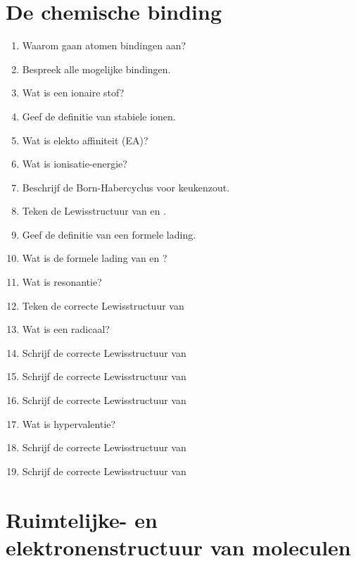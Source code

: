 \documentclass[a4paper,12pt]{article}
\begin{document}
    \section{De chemische binding}

    \begin{enumerate}
        \item Waarom gaan atomen bindingen aan?
        \item Bespreek alle mogelijke bindingen.
        \item Wat is een ionaire stof?
        \item Geef de definitie van stabiele ionen.
        \item Wat is elekto affiniteit (EA)?
        \item Wat is ionisatie-energie?
        \item Beschrijf de Born-Habercyclus voor keukenzout.
        \item Teken de Lewisstructuur van  en .
        \item Geef de definitie van een formele lading.
        \item Wat is de formele lading van  en ?
        \item Wat is resonantie?
        \item Teken de correcte Lewisstructuur van 
        \item Wat is een radicaal?
        \item Schrijf de correcte Lewisstructuur van 
        \item Schrijf de correcte Lewisstructuur van 
        \item Schrijf de correcte Lewisstructuur van 
        \item Wat is hypervalentie?
        \item Schrijf de correcte Lewisstructuur van 
        \item Schrijf de correcte Lewisstructuur van 
    \end{enumerate}

    \section{Ruimtelijke- en elektronenstructuur van moleculen}
\end{document}
